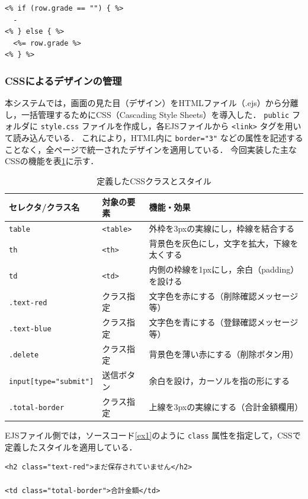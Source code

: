 \begin{lstlisting}[caption=EJSでの条件分岐の例]
<% if (row.grade == "") { %>
  -
<% } else { %>
  <%= row.grade %>
<% } %>
\end{lstlisting}

\subsubsection{CSSによるデザインの管理}
本システムでは，画面の見た目（デザイン）をHTMLファイル（.ejs）から分離し，一括管理するためにCSS（Cascading Style Sheets）を導入した．
\texttt{public} フォルダに \texttt{style.css} ファイルを作成し，各EJSファイルから \texttt{<link>} タグを用いて読み込んでいる．
これにより，HTML内に \texttt{border="3"} などの属性を記述することなく，全ページで統一されたデザインを適用している．
今回実装した主なCSSの機能を表\ref{tab:css}に示す．

\begin{table}[H]
\caption{定義したCSSクラスとスタイル}
\label{tab:css}
\centering
\begin{tabular}{l|l|l}
\hline
セレクタ/クラス名 & 対象の要素 & 機能・効果 \\
\hline \hline
\texttt{table} & \texttt{<table>} & 外枠を3pxの実線にし，枠線を結合する \\
\texttt{th} & \texttt{<th>} & 背景色を灰色にし，文字を拡大，下線を太くする \\
\texttt{td} & \texttt{<td>} & 内側の枠線を1pxにし，余白（padding）を設ける \\
\texttt{.text-red} & クラス指定 & 文字色を赤にする（削除確認メッセージ等） \\
\texttt{.text-blue} & クラス指定 & 文字色を青にする（登録確認メッセージ等） \\
\texttt{.delete} & クラス指定 & 背景色を薄い赤にする（削除ボタン用） \\
\texttt{input[type="submit"]} & 送信ボタン & 余白を設け，カーソルを指の形にする \\
\texttt{.total-border} & クラス指定 & 上線を3pxの実線にする（合計金額欄用） \\
\hline
\end{tabular}
\end{table}

EJSファイル側では，ソースコード\ref{ex1}のように \texttt{class} 属性を指定して，CSSで定義したスタイルを適用している．

\begin{lstlisting}[caption=CSSクラスの適用例, label=ex1]
<h2 class="text-red">まだ保存されていません</h2>

<td class="total-border">合計金額</td>
\end{lstlisting}

